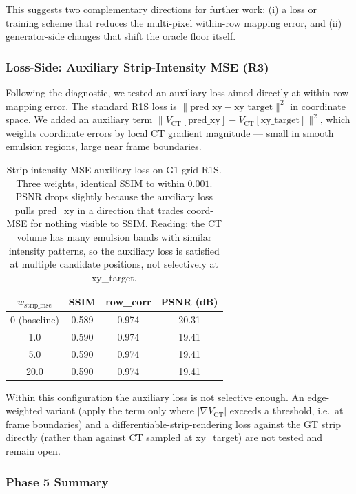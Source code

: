 \documentclass[11pt,a4paper]{article}
\begin{document}
This suggests two complementary directions for further work: (i) a loss or training scheme that reduces the multi-pixel within-row mapping error, and (ii) generator-side changes that shift the oracle floor itself.

\subsubsection{Loss-Side: Auxiliary Strip-Intensity MSE (R3)}

Following the diagnostic, we tested an auxiliary loss aimed directly at within-row mapping error. The standard R1S loss is $\lVert \mathrm{pred\_xy} - \mathrm{xy\_target} \rVert^2$ in coordinate space. We added an auxiliary term $\lVert V_{\mathrm{CT}}[\mathrm{pred\_xy}] - V_{\mathrm{CT}}[\mathrm{xy\_target}] \rVert^2$, which weights coordinate errors by local CT gradient magnitude --- small in smooth emulsion regions, large near frame boundaries.

\begin{table}[H]
\centering
\begin{tabular}{cccc}
\toprule
$w_{\mathrm{strip\_mse}}$ & SSIM & row\_corr & PSNR (dB) \\
\midrule
0 (baseline) & 0.589 & 0.974 & 20.31 \\
1.0  & 0.590 & 0.974 & 19.41 \\
5.0  & 0.590 & 0.974 & 19.41 \\
20.0 & 0.590 & 0.974 & 19.41 \\
\bottomrule
\end{tabular}
\caption{Strip-intensity MSE auxiliary loss on G1 grid R1S. Three weights, identical SSIM to within $0.001$. PSNR drops slightly because the auxiliary loss pulls pred\_xy in a direction that trades coord-MSE for nothing visible to SSIM. Reading: the CT volume has many emulsion bands with similar intensity patterns, so the auxiliary loss is satisfied at multiple candidate positions, not selectively at xy\_target.}
\label{tab:phase5_smse}
\end{table}

Within this configuration the auxiliary loss is not selective enough. An edge-weighted variant (apply the term only where $\lvert \nabla V_{\mathrm{CT}} \rvert$ exceeds a threshold, i.e.\ at frame boundaries) and a differentiable-strip-rendering loss against the GT strip directly (rather than against CT sampled at xy\_target) are not tested and remain open.

\subsubsection{Phase 5 Summary}
\label{sec:phase5_summary}
\end{document}
